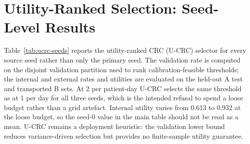 \section{Utility-Ranked Selection: Seed-Level Results}
\label{sec:supp-ucrc}

Table~\ref{tab:ucrc-seeds} reports the utility-ranked CRC (U-CRC) selector for every source seed rather than only the primary seed. The validation rate is computed on the disjoint validation partition used to rank calibration-feasible thresholds; the internal and external rates and utilities are evaluated on the held-out A test and transported B sets. At 2 per patient-day U-CRC selects the same threshold as at 1 per day for all three seeds, which is the intended refusal to spend a loose budget rather than a grid artefact. Internal utility varies from 0.613 to 0.932 at the loose budget, so the seed-0 value in the main table should not be read as a mean. U-CRC remains a deployment heuristic: the validation lower bound reduces variance-driven selection but provides no finite-sample utility guarantee.

\begin{table}[H]
\centering
\caption{Seed-level U-CRC results. ``Val.'' is the mean alarm rate on the validation partition; ``Int.'' and ``Ext.'' are the held-out A test and transported B evaluation. Utility is the official 2019 challenge score (inactive $=0$, oracle $=1$).}
\label{tab:ucrc-seeds}
\small
{}
\end{table}
